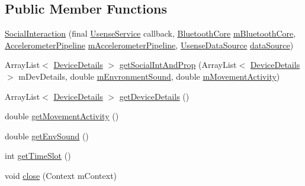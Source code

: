\subsection*{Public Member Functions}
\begin{DoxyCompactItemize}
\item 
\hyperlink{classcs_1_1usense_1_1inference_module_1_1_social_interaction_a008bc58316443848aa38abfdd6f2aca6}{Social\+Interaction} (final \hyperlink{classcs_1_1usense_1_1_usense_service}{Usense\+Service} callback, \hyperlink{classcs_1_1usense_1_1bluetooth_1_1_bluetooth_core}{Bluetooth\+Core} \hyperlink{classcs_1_1usense_1_1inference_module_1_1_social_interaction_ad0f1b8b19badca0a9df86456ffce3e9f}{m\+Bluetooth\+Core}, \hyperlink{classcs_1_1usense_1_1accelerometer_1_1_accelerometer_pipeline}{Accelerometer\+Pipeline} \hyperlink{classcs_1_1usense_1_1inference_module_1_1_social_interaction_a776cd03378e4775b26c921493c79e049}{m\+Accelerometer\+Pipeline}, \hyperlink{classcs_1_1usense_1_1db_1_1_usense_data_source}{Usense\+Data\+Source} \hyperlink{classcs_1_1usense_1_1inference_module_1_1_social_interaction_ae262493088f3c957e6c2402728e93116}{data\+Source})
\item 
Array\+List$<$ \hyperlink{classcs_1_1usense_1_1inference_module_1_1_social_interaction_1_1_device_details}{Device\+Details} $>$ \hyperlink{classcs_1_1usense_1_1inference_module_1_1_social_interaction_a7ad215497fe59b89a3affcfb04e0445a}{get\+Social\+Int\+And\+Prop} (Array\+List$<$ \hyperlink{classcs_1_1usense_1_1inference_module_1_1_social_interaction_1_1_device_details}{Device\+Details} $>$ m\+Dev\+Details, double \hyperlink{classcs_1_1usense_1_1inference_module_1_1_social_interaction_a71175553a50cb899d8ef2f19c7b70852}{m\+Envronment\+Sound}, double \hyperlink{classcs_1_1usense_1_1inference_module_1_1_social_interaction_ab00945e5a52810f2d7e051f2e4878d4c}{m\+Movement\+Activity})
\item 
Array\+List$<$ \hyperlink{classcs_1_1usense_1_1inference_module_1_1_social_interaction_1_1_device_details}{Device\+Details} $>$ \hyperlink{classcs_1_1usense_1_1inference_module_1_1_social_interaction_a80b7d32508f3500e16b3d451e9580cae}{get\+Device\+Details} ()
\item 
double \hyperlink{classcs_1_1usense_1_1inference_module_1_1_social_interaction_a87183f8e25c99b8a5dfe8fbbead6a736}{get\+Movement\+Activity} ()
\item 
double \hyperlink{classcs_1_1usense_1_1inference_module_1_1_social_interaction_ad399c7eba23aaa35835919c4b9430a2c}{get\+Env\+Sound} ()
\item 
int \hyperlink{classcs_1_1usense_1_1inference_module_1_1_social_interaction_a17f3d81c5df1d84759d68de2092927db}{get\+Time\+Slot} ()
\item 
void \hyperlink{classcs_1_1usense_1_1inference_module_1_1_social_interaction_aef365405aa6511cfaa448538ac90ed14}{close} (Context m\+Context)
\end{DoxyCompactItemize}
